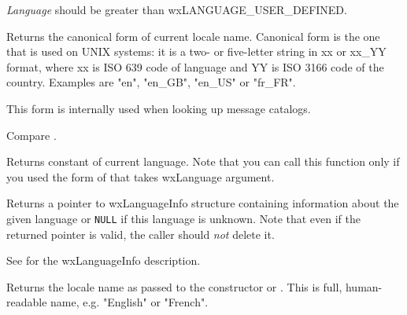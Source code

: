{\it Language} should be greater than wxLANGUAGE\_USER\_DEFINED.



\label{wxlocalegetcanonicalname}


Returns the canonical form of current locale name. Canonical form is the
one that is used on UNIX systems: it is a two- or five-letter string in xx or
xx\_YY format, where xx is ISO 639 code of language and YY is ISO 3166 code of
the country. Examples are "en", "en\_GB", "en\_US" or "fr\_FR".

This form is internally used when looking up message catalogs.

Compare .



\label{wxlocalegetlanguage}


Returns  constant of current language.
Note that you can call this function only if you used the form of
 that takes wxLanguage argument.

\label{wxlocalegetlanguageinfo}


Returns a pointer to wxLanguageInfo structure containing information about the
given language or {\tt NULL} if this language is unknown. Note that even if the
returned pointer is valid, the caller should {\it not} delete it.

See  for the wxLanguageInfo
description.


\label{wxlocalegetlocale}


Returns the locale name as passed to the constructor or 
. This is full, human-readable name,
e.g. "English" or "French".


\label{wxlocalegetname}


